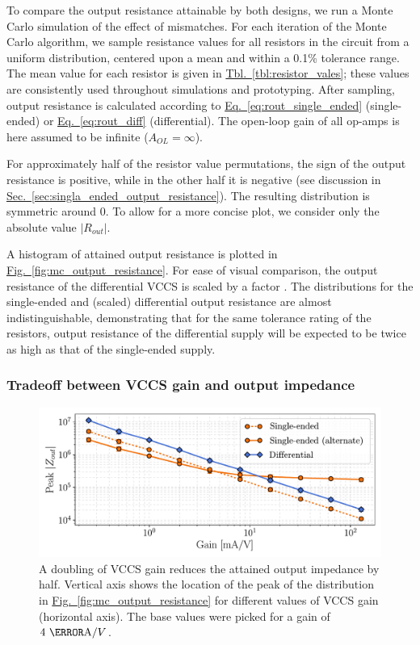 \documentclass[10pt]{article}
\newcommand{\briefeqlink}[1]{\hyperref[#1]{Eq.~\ref*{#1}}\xspace }
\newcommand{\tablelink}[1]{\hyperref[#1]{Tbl.~\ref*{#1}}\xspace }
\newcommand{\briefseclink}[1]{\hyperref[#1]{Sec.~\ref*{#1}}}
\newcommand{\brieffiglink}[1]{\hyperref[#1]{Fig.~\ref*{#1}}}
\begin{document}
To compare the output resistance attainable by both designs, we run a Monte Carlo simulation of the effect of mismatches. For each iteration of the Monte Carlo algorithm, we sample resistance values for all resistors in the circuit from a uniform distribution, centered upon a mean and within a 0.1\% tolerance range. The mean value for each resistor is given in \tablelink{tbl:resistor_vales}; these values are consistently used throughout simulations and prototyping. After sampling, output resistance is calculated according to \briefeqlink{eq:rout_single_ended} (single-ended) or \briefeqlink{eq:rout_diff} (differential). The open-loop gain of all op-amps is here assumed to be infinite ($A_{OL}=\infty$).

For approximately half of the resistor value permutations, the sign of the output resistance is positive, while in the other half it is negative (see discussion in \briefseclink{sec:singla_ended_output_resistance}). The resulting distribution is symmetric around 0. To allow for a more concise plot, we consider only the absolute value $|R_{out}|$.

A histogram of attained output resistance is plotted in \brieffiglink{fig:mc_output_resistance}. For ease of visual comparison, the output resistance of the differential VCCS is scaled by a factor \textonehalf. The distributions for the single-ended and (scaled) differential output resistance are almost indistinguishable, demonstrating that for the same tolerance rating of the resistors, output resistance of the differential supply will be expected to be twice as high as that of the single-ended supply.

\subsubsection{Tradeoff between VCCS gain and output impedance}
\label{sec:tradeoff_gain_impedance}

\begin{figure}[b!]
	\centering
	\includegraphics[scale=.6]{fig_mc_output_resistance_across_gain.pdf}
	\caption{\small A doubling of VCCS gain reduces the attained output impedance by half. Vertical axis shows the location of the peak of the distribution in \brieffiglink{fig:mc_output_resistance} for different values of VCCS gain (horizontal axis). The base values were picked for a gain of $4~\milli\ampere/V$.}
	\label{fig:mc_output_resistance_across_gain}
\end{figure}
\end{document}
